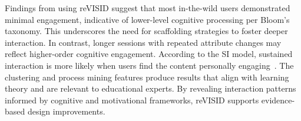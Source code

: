 \documentclass[preprint,journal]{vgtc}            %
\begin{document}
Findings from using reVISID suggest that most in-the-wild users demonstrated minimal engagement, indicative of lower-level cognitive processing per Bloom’s taxonomy. 
 This underscores the need for scaffolding strategies to foster deeper interaction.
In contrast, longer sessions with repeated attribute changes may reflect higher-order cognitive engagement.
According to the SI model, sustained interaction is more likely when users find the content personally engaging~\cite{Lisa10Measuring}. 
 The clustering and process mining features produce results that align with learning theory and are relevant to educational experts. 
By revealing interaction patterns informed by cognitive and motivational frameworks, reVISID supports evidence-based design improvements.


\end{document}
